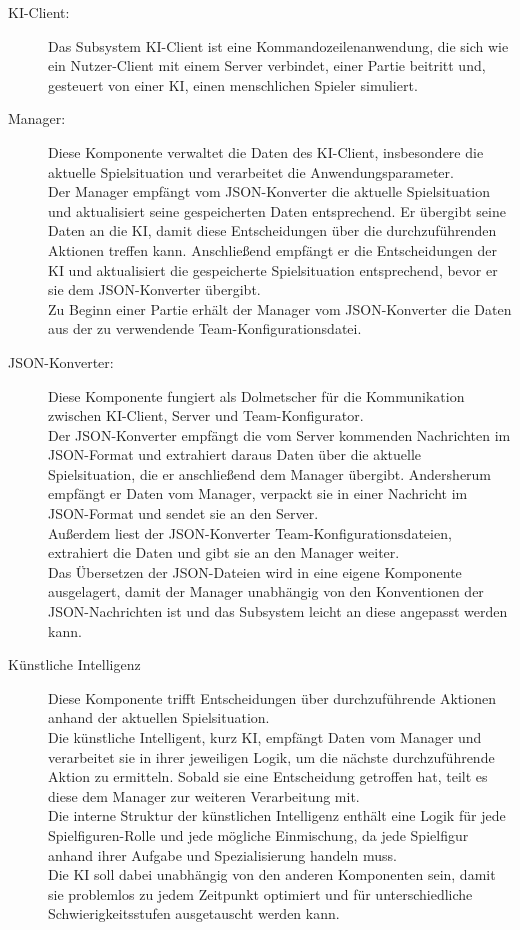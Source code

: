 \begin{description}
	\item[KI-Client:] 
	Das Subsystem KI-Client ist eine Kommandozeilenanwendung, die sich wie ein Nutzer-Client mit einem Server verbindet, einer Partie beitritt und, gesteuert von einer KI, einen menschlichen Spieler simuliert. 
	\\
	\item[Manager:]
	Diese Komponente verwaltet die Daten des KI-Client, insbesondere die aktuelle Spielsituation und verarbeitet die Anwendungsparameter.\\ Der Manager empfängt vom JSON-Konverter die aktuelle Spielsituation und aktualisiert seine gespeicherten Daten entsprechend. Er übergibt seine Daten an die KI, damit diese Entscheidungen über die durchzuführenden Aktionen treffen kann. Anschließend empfängt er die Entscheidungen der KI und aktualisiert die gespeicherte Spielsituation entsprechend, bevor er sie dem JSON-Konverter übergibt.\\
	Zu Beginn einer Partie erhält der Manager vom JSON-Konverter die Daten aus der zu verwendende Team-Konfigurationsdatei. 
	\\
	\item[JSON-Konverter:]
	Diese Komponente fungiert als Dolmetscher für die Kommunikation zwischen KI-Client, Server und Team-Konfigurator.\\
	Der JSON-Konverter empfängt die vom Server kommenden Nachrichten im JSON-Format und extrahiert daraus Daten über die aktuelle Spielsituation, die er anschließend dem Manager übergibt. Andersherum empfängt er Daten vom Manager, verpackt sie in einer Nachricht im JSON-Format und sendet sie an den Server.\\
	Außerdem liest der JSON-Konverter Team-Konfigurationsdateien, extrahiert die Daten und gibt sie an den Manager weiter.\\
	Das Übersetzen der JSON-Dateien wird in eine eigene Komponente ausgelagert, damit der Manager unabhängig von den Konventionen der JSON-Nachrichten ist und das Subsystem leicht an diese angepasst werden kann.
	\\
	\item[Künstliche Intelligenz] 
	Diese Komponente trifft Entscheidungen über durchzuführende Aktionen anhand der aktuellen Spielsituation.\\
	Die künstliche Intelligent, kurz KI, empfängt Daten vom Manager und verarbeitet sie in ihrer jeweiligen Logik, um die nächste durchzuführende Aktion zu ermitteln. Sobald sie eine Entscheidung getroffen hat, teilt es diese dem Manager zur weiteren Verarbeitung mit.\\
	Die interne Struktur der künstlichen Intelligenz enthält eine Logik für jede Spielfiguren-Rolle und jede mögliche Einmischung, da jede Spielfigur anhand ihrer Aufgabe und Spezialisierung handeln muss.\\
	Die KI soll dabei unabhängig von den anderen Komponenten sein, damit sie problemlos zu jedem Zeitpunkt optimiert und für unterschiedliche Schwierigkeitsstufen ausgetauscht werden kann.
\end{description}

